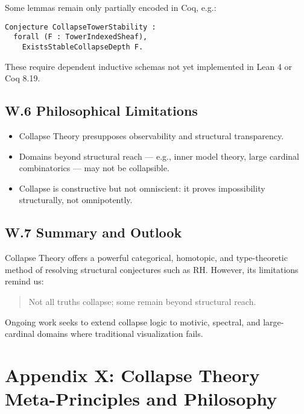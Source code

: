 \documentclass[11pt]{article}
\begin{document}
Some lemmas remain only partially encoded in Coq, e.g.:

\begin{lstlisting}[language=Coq, caption=Unresolved Encoding, captionpos=b]
Conjecture CollapseTowerStability :
  forall (F : TowerIndexedSheaf),
    ExistsStableCollapseDepth F.
\end{lstlisting}

These require dependent inductive schemas not yet implemented in Lean 4 or Coq 8.19.

\subsection*{W.6 Philosophical Limitations}

\begin{itemize}
  \item Collapse Theory presupposes observability and structural transparency.
  \item Domains beyond structural reach — e.g., inner model theory, large cardinal combinatorics — may not be collapsible.
  \item Collapse is constructive but not omniscient: it proves impossibility structurally, not omnipotently.
\end{itemize}

\subsection*{W.7 Summary and Outlook}

Collapse Theory offers a powerful categorical, homotopic, and type-theoretic method of resolving structural conjectures such as RH. However, its limitations remind us:

\begin{quote}
Not all truths collapse; some remain beyond structural reach.
\end{quote}

Ongoing work seeks to extend collapse logic to motivic, spectral, and large-cardinal domains where traditional visualization fails.



\appendix
\section*{Appendix X: Collapse Theory Meta-Principles and Philosophy}
\end{document}
